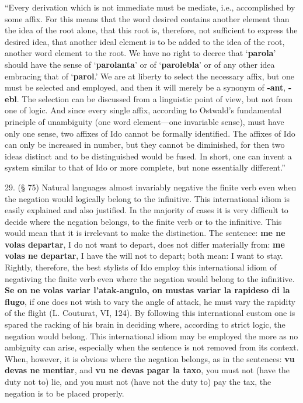 ``Every derivation which is not immediate must be mediate, i.e., accomplished by some affix. For this means that the word desired contains another element than the idea of the root alone, that this root is, therefore, not sufficient to express the desired idea, that another ideal element is to be added to the idea of the root, another word element to the root. We have no right to decree that `\textbf{parola}' should have the sense of `\textbf{parolanta}' or of `\textbf{parolebla}' or of any other idea embracing that of `\textbf{parol}.' We are at liberty to select the necessary affix, but one must be selected and employed, and then it will merely be a synonym of \textbf{-ant}, \textbf{-ebl}. The selection can be discussed from a linguistic point of view, but not from one of logic. And since every single affix, according to Ostwald's fundamental principle of unambiguity (one word element—one invariable sense), must have only one sense, two affixes of Ido cannot be formally identified. The affixes of Ido can only be increased in number, but they cannot be diminished, for then two ideas distinct and to be distinguished would be fused. In short, one can invent a system similar to that of Ido or more complete, but none essentially different.''

29. (§ 75) Natural languages almost invariably negative the finite verb even when the negation would logically belong to the infinitive. This international idiom is easily explained and also justified. In the majority of cases it is very difficult to decide where the negation belongs, to the finite verb or to the infinitive. This would mean that it is irrelevant to make the distinction. The sentence: \textbf{me ne volas departar}, I do not want to depart, does not differ materially from: \textbf{me volas ne departar}, I have the will not to depart; both mean: I want to stay. Rightly, therefore, the best stylists of Ido employ this international idiom of negativing the finite verb even where the negation would belong to the infinitive. \textbf{Se on ne volas variar l'atak-angulo, on mustas variar la rapideso di la flugo}, if one does not wish to vary the angle of attack, he must vary the rapidity of the flight (L. Couturat, VI, 124). By following this international custom one is spared the racking of his brain in deciding where, according to strict logic, the negation would belong. This international idiom may be employed the more as no ambiguity can arise, especially when the sentence is not removed from its context. When, however, it is obvious where the negation belongs, as in the sentences: \textbf{vu devas ne mentiar}, and \textbf{vu ne devas pagar la taxo}, you must not (have the duty not to) lie, and you must not (have not the duty to) pay the tax, the negation is to be placed properly. %

